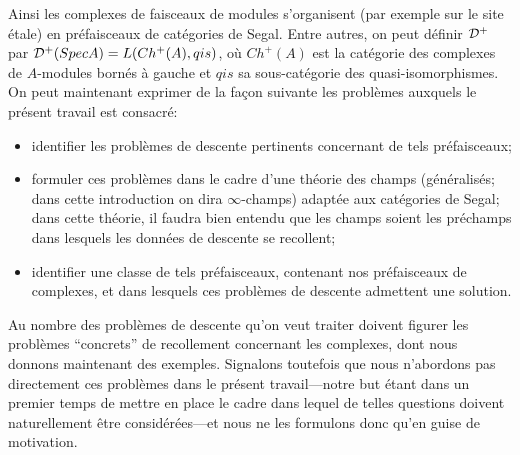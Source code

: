 \documentclass[12pt]{article}
\begin{document}
Ainsi les complexes de faisceaux de modules s'organisent (par exemple
sur le site \'etale)
en pr\'efaisceaux de cat\'egories de Segal. Entre autres, on peut d\'efinir
${\cal D}^+$ par ${\cal D}^+(Spec A)= L(Ch^+(A), qis)$, o\`u
$Ch^+(A) $ est la cat\'egorie des complexes de $A$-modules born\'es \`a gauche
et $qis$ sa sous-cat\'egorie des quasi-isomorphismes.
On peut
maintenant
exprimer de la fa\c{c}on suivante les probl\`emes auxquels le pr\'esent travail
est consacr\'e:
\begin{itemize}
\item
identifier les probl\`emes de descente pertinents concernant de tels
pr\'efaisceaux;
\item
formuler ces probl\`emes dans le cadre d'une th\'eorie des
champs (g\'en\'eralis\'es; dans cette introduction on dira $\infty$-champs)
adapt\'ee aux cat\'egories de Segal; dans cette th\'eorie, il faudra
bien entendu que les champs soient les pr\'echamps dans lesquels les donn\'ees
de descente se recollent;
\item
identifier une classe de tels pr\'efaisceaux, contenant nos pr\'efaisceaux
de complexes, et dans lesquels ces probl\`emes de descente admettent
une solution.
\end {itemize}

Au nombre des probl\`emes de descente qu'on veut traiter doivent figurer
les probl\`emes ``concrets'' de recollement
concernant les complexes, dont nous donnons maintenant des exemples.
Signalons toutefois que nous n'abordons pas directement ces
probl\`emes dans le pr\'esent travail---notre but \'etant dans un premier
temps de mettre en place le
cadre dans lequel de telles questions doivent naturellement
\^etre consid\'er\'ees---et nous ne les formulons
donc qu'en guise de
motivation.
\end{document}
